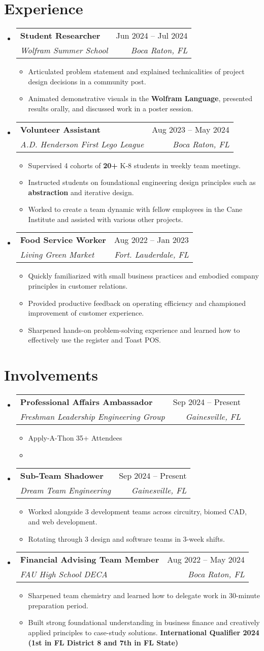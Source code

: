 \documentclass[letterpaper,11pt]{article} %
\makeatletter
\newcommand{\resumeItem}[1]{
  \item\small{
    {#1 \vspace{-4pt}}
  }
}
\newcommand{\resumeSubheading}[4]{
  \vspace{-3pt}\item
    \begin{tabular*}{0.97\textwidth}[t]{l@{\extracolsep{\fill}}r}
      \textbf{#1} & #2 \\
      \textit{\small#3} & \textit{\small #4} \\
    \end{tabular*}\vspace{-7pt}
}
\newcommand{\resumeSubHeadingListStart}{\begin{itemize}[leftmargin=0.15in, label={}]}
\newcommand{\resumeSubHeadingListEnd}{\end{itemize}}
\newcommand{\resumeItemListStart}{\begin{itemize}}
\newcommand{\resumeItemListEnd}{\end{itemize}\vspace{-5pt}}
\makeatother
\begin{document}
\section{\textbf{Experience}}
  \resumeSubHeadingListStart
    \resumeSubheading
      {Student Researcher}{Jun 2024 -- Jul 2024}
      {Wolfram Summer School}{Boca Raton, FL}
      \resumeItemListStart
        \resumeItem{Articulated problem statement and explained technicalities of project design decisions in a community post.}
        \resumeItem{Animated demonstrative visuals in the \textbf{Wolfram Language}, presented results orally, and discussed work in a poster session.}
      \resumeItemListEnd
    \resumeSubheading
      {Volunteer Assistant}{Aug 2023 -- May 2024}
      {A.D. Henderson First Lego League}{Boca Raton, FL}
      \resumeItemListStart
        \resumeItem{Supervised 4 cohorts of \textbf{20+} K-8 students in weekly team meetings.}
        \resumeItem{Instructed students on foundational engineering design principles such as \textbf{abstraction} and iterative design.}
        \resumeItem{Worked to create a team dynamic with fellow employees in the Cane Institute and assisted with various other projects.}
      \resumeItemListEnd
    \resumeSubheading
      {Food Service Worker}{Aug 2022 -- Jan 2023}
      {Living Green Market}{Fort. Lauderdale, FL}
      \resumeItemListStart
        \resumeItem{Quickly familiarized with small business practices and embodied company principles in customer relations.}
        \resumeItem{Provided productive feedback on operating efficiency and championed improvement of customer experience.}
        \resumeItem{Sharpened hands-on problem-solving experience and learned how to effectively use the register and Toast POS.}
      \resumeItemListEnd
      
  \resumeSubHeadingListEnd

\section{Involvements}
  \resumeSubHeadingListStart
    \resumeSubheading
      {Professional Affairs Ambassador}{Sep 2024 -- Present}
      {Freshman Leadership Engineering Group}{Gainesville, FL}
      \resumeItemListStart
        \resumeItem{Apply-A-Thon 35+ Attendees}
        \resumeItem{}
      \resumeItemListEnd
    \resumeSubheading
      {Sub-Team Shadower}{Sep 2024 -- Present}
      {Dream Team Engineering}{Gainesville, FL}
      \resumeItemListStart
        \resumeItem{Worked alongside 3 development teams across circuitry, biomed CAD, and web development.}
        \resumeItem{Rotating through 3 design and software teams in 3-week shifts.}
      \resumeItemListEnd
    \resumeSubheading
      {Financial Advising Team Member}{Aug 2022 -- May 2024}
      {FAU High School DECA}{Boca Raton, FL}
      \resumeItemListStart
        \resumeItem{Sharpened team chemistry and learned how to delegate work in 30-minute preparation period.}
        \resumeItem{Built strong foundational understanding in business finance and creatively applied principles to case-study solutions. \textbf{International Qualifier 2024 (1st in FL District 8 and 7th in FL State)}}
      \resumeItemListEnd
  \resumeSubHeadingListEnd
  
\end{document}
